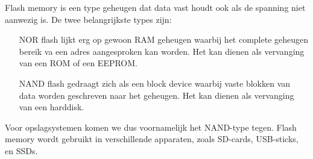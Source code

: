 Flash memory is een type geheugen dat data vast houdt ook als de spanning niet aanwezig is. De twee belangrijkste types zijn:
\begin{itemize}
	\item [NOR flash]  lijkt erg op gewoon RAM geheugen waarbij het complete geheugen bereik va een adres aangesproken kan worden. Het kan dienen als vervanging van een ROM of een EEPROM.
	\item [NAND flash]  gedraagt zich als een block device waarbij vaste blokken van data worden geschreven naar het geheugen. Het kan dienen als vervanging van een harddisk.
\end{itemize}
Voor opslagsystemen komen we dus voornamelijk het NAND-type tegen. Flash memory wordt gebruikt in verschillende apparaten, zoals SD-cards, USB-sticks, en SSDs.

